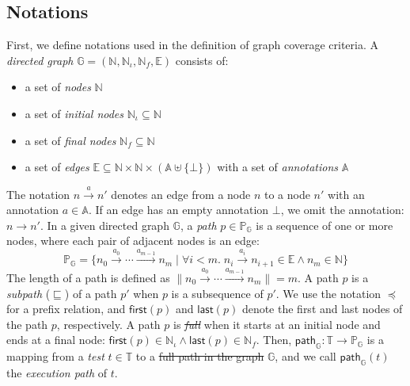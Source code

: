 \documentclass[acmsmall,review,screen]{acmart}
\newcommand{\name}[1]{\textsf{#1}}
\newcommand{\graph}{\mathbb{G}}
\newcommand{\nodeset}{\mathbb{N}}
\newcommand{\node}{n}
\newcommand{\inodeset}{\nodeset_\iota}
\newcommand{\fnodeset}{\nodeset_f}
\newcommand{\edgeset}{\mathbb{E}}
\newcommand{\edge}[1]{\xrightarrow{#1}}
\newcommand{\annotset}{\mathbb{A}}
\newcommand{\annot}{a}
\newcommand{\patset}[1]{\mathbb{P}_{#1}}
\newcommand{\pat}{p}
\newcommand{\patmap}[1]{\name{path}_{#1}}
\newcommand{\getfirst}{\name{first}}
\newcommand{\getlast}{\name{last}}
\newcommand{\testset}{\mathbb{T}}
\newcommand{\test}{t}
\newcommand{\prefix}{\preceq}
\newcommand{\subpath}{\sqsubseteq}
\newcommand{\norm}[1]{\lVert{#1}\rVert}
\providecommand{\DIFaddtex}[1]{{\protect\color{blue}\uwave{#1}}} %
\providecommand{\DIFdeltex}[1]{{\protect\color{red}\sout{#1}}}                      %
\providecommand{\DIFaddbegin}{} %
\providecommand{\DIFaddend}{} %
\providecommand{\DIFdelbegin}{} %
\providecommand{\DIFdelend}{} %
\providecommand{\DIFadd}[1]{\texorpdfstring{\DIFaddtex{#1}}{#1}} %
\providecommand{\DIFdel}[1]{\texorpdfstring{\DIFdeltex{#1}}{}} %
\newcommand{\DIFscaledelfig}{0.5}
\newlength{\DIFdelgraphicswidth} %
\newlength{\DIFdelgraphicsheight} %
\newcommand{\DIFaddincludegraphics}[2][]{{\color{blue}\fbox{\DIFOincludegraphics[#1]{#2}}}} %
\newcommand{\DIFdelincludegraphics}[2][]{%
\sbox{\DIFdelgraphicsbox}{\DIFOincludegraphics[#1]{#2}}%
\settoboxwidth{\DIFdelgraphicswidth}{\DIFdelgraphicsbox} %
\settoboxtotalheight{\DIFdelgraphicsheight}{\DIFdelgraphicsbox} %
\scalebox{\DIFscaledelfig}{%
\parbox[b]{\DIFdelgraphicswidth}{\usebox{\DIFdelgraphicsbox}\\[-\baselineskip] \rule{\DIFdelgraphicswidth}{0em}}\llap{\resizebox{\DIFdelgraphicswidth}{\DIFdelgraphicsheight}{%
\setlength{\unitlength}{\DIFdelgraphicswidth}%
\begin{picture}(1,1)%
\thicklines\linethickness{2pt} %
{\color[rgb]{1,0,0}\put(0,0){\framebox(1,1){}}}%
{\color[rgb]{1,0,0}\put(0,0){\line( 1,1){1}}}%
{\color[rgb]{1,0,0}\put(0,1){\line(1,-1){1}}}%
\end{picture}%
}\hspace*{3pt}}} %
} %
\DeclareRobustCommand{\DIFaddbegin}{\DIFOaddbegin \let\includegraphics\DIFaddincludegraphics} %
\DeclareRobustCommand{\DIFaddend}{\DIFOaddend \let\includegraphics\DIFOincludegraphics} %
\DeclareRobustCommand{\DIFdelbegin}{\DIFOdelbegin \let\includegraphics\DIFdelincludegraphics} %
\DeclareRobustCommand{\DIFdelend}{\DIFOaddend \let\includegraphics\DIFOincludegraphics} %
\begin{document}


\subsection{Notations}\label{sec:notation}
%
First, we define notations used in the definition of graph coverage criteria.
%
A \textit{directed graph} $\graph = (\nodeset, \inodeset,
\fnodeset, \edgeset)$ consists of:
\begin{itemize}
  \item a set of \textit{nodes} $\nodeset$
  \item a set of \textit{initial nodes} $\inodeset \subseteq \nodeset$
  \item a set of \textit{final nodes} $\fnodeset \subseteq \nodeset$
  \item a set of \textit{edges} $\edgeset \subseteq \nodeset \times \nodeset
    \times (\annotset \uplus \{ \bot \})$ with a set of \textit{annotations}
    $\annotset$
\end{itemize}
%
The notation $\node \edge{\annot} \node'$ denotes an edge from a node $\node$ to
a node $\node'$ with an annotation $\annot \in \annotset$.
%
If an edge has an empty annotation $\bot$, we omit the annotation: $\node
\edge{} \node'$.
%
In a given directed graph $\graph$, a \textit{path} $\pat \in \patset{\graph}$
is a sequence of one or more nodes, where each pair of adjacent nodes is an
edge:
\begin{equation}\label{euq:path-def}
  \patset{\graph} = \{
    \node_0 \edge{\annot_0} \cdots \edge{\annot_{m-1}} \node_m \mid
    \forall i < m. \; \node_i \edge{\annot_i} \node_{i+1} \in \edgeset \wedge
    \node_m \in \nodeset
  \}
\end{equation}
%
The length of a path is defined as $\norm{\node_0 \edge{\annot_0} \cdots
\edge{\annot_{m-1}} \node_m} = m$.
%
A path $\pat$ is a \textit{subpath} ($\subpath$) of a path $\pat'$ when $\pat$
is a subsequence of $\pat'$.
%
We use the notation $\prefix$ for a prefix relation, and $\getfirst(\pat)$ and
$\getlast(\pat)$ denote the first and last nodes of the path $\pat$,
respectively.
%
A path $\pat$ is \DIFaddbegin \DIFadd{a }\DIFaddend \textit{\DIFdelbegin \DIFdel{full}\DIFdelend \DIFaddbegin \DIFadd{test path}\DIFaddend } when it starts at an initial node and ends
at a final node: $\getfirst(\pat) \in \inodeset \wedge \getlast(\pat) \in
\fnodeset$.
%
Then, $\patmap{\graph} : \testset \rightarrow \patset{\graph}$ is a mapping from
a \textit{test} $\test \in \testset$ to a \DIFdelbegin \DIFdel{full path in the graph }\DIFdelend \DIFaddbegin \DIFadd{test path in }\DIFaddend $\graph$, and we call
$\patmap{\graph}(\test)$ the \textit{execution path} of $\test$.
\end{document}
